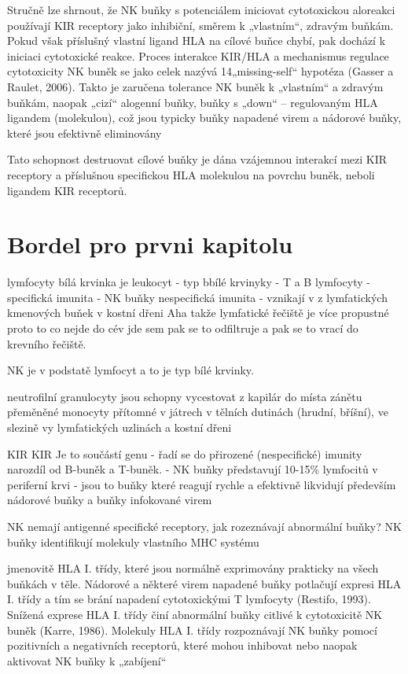 \documentclass[czech,DP]{thesiskiv}
\begin{document}
Stručně lze shrnout, že NK buňky s potenciálem iniciovat cytotoxickou aloreakci používají
KIR receptory jako inhibiční, směrem k „vlastním“, zdravým buňkám. Pokud však příslušný
vlastní ligand HLA na cílové buňce chybí, pak dochází k iniciaci cytotoxické reakce. Proces
interakce KIR/HLA a mechanismus regulace cytotoxicity NK buněk se jako celek nazývá
14„missing-self“ hypotéza (Gasser a Raulet, 2006). Takto je zaručena tolerance NK buněk k
„vlastním“ a zdravým buňkám, naopak „cizí“ alogenní buňky, buňky s „down“ –
regulovaným
HLA ligandem (molekulou), což jsou typicky buňky napadené virem a
nádorové buňky, které jsou efektivně eliminovány

 Tato schopnost destruovat cílové buňky je dána
vzájemnou interakcí mezi KIR receptory a příslušnou specifickou
HLA molekulou na povrchu buněk, neboli ligandem KIR receptorů.


\section{Bordel pro prvni kapitolu}

lymfocyty 
bílá krvinka je leukocyt
- typ bbílé krvinyky 
- T a B lymfocyty - specifická imunita
- NK buňky nespecifická imunita
- vznikají v z lymfatických kmenových buňek v kostní dřeni
Aha takže lymfatické řečiště je více propustné proto to co nejde do cév jde sem pak se to odfiltruje a pak se to vrací do krevního řečiště.

NK je v podstatě lymfocyt a to je typ bílé krvinky.

neutrofilní granulocyty jsou schopny vycestovat z kapilár do místa zánětu
přeměněné monocyty přítomné v játrech v tělních dutinách (hrudní, bříšní), ve slezině vy lymfatických uzlinách a kostní dřeni

KIR
KIR  Je to součástí genu
- řadí se do přirozené (nespecifické) imunity narozdíl od B-buněk a T-buněk.
- NK buňky představují 10-15\% lymfocitů v periferní krvi
- jsou to buňky které reagují rychle a efektivně likvidují především nádorové buňky a buňky infokované virem

NK nemají antigenné specifické receptory, jak rozeznávají abnormální buňky? 
NK buňky identifikují molekuly vlastního MHC systému 

 jmenovitě HLA I. třídy, které jsou normálně exprimovány
prakticky na všech buňkách v těle. Nádorové a některé virem napadené buňky potlačují
expresi HLA I. třídy a tím se brání napadení cytotoxickými T lymfocyty (Restifo, 1993).
Snížená exprese HLA I. třídy činí abnormální buňky citlivé k cytotoxicitě NK buněk (Karre,
1986). Molekuly HLA I. třídy rozpoznávají NK buňky pomocí pozitivních a negativních 
receptorů, které mohou inhibovat nebo naopak aktivovat NK buňky k „zabíjení“
\end{document}
